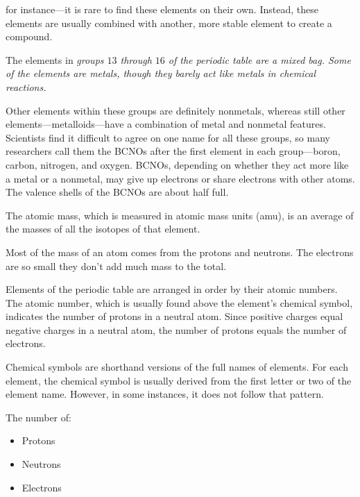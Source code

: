 for instance—it is rare to find these elements on their own. Instead, these
elements are usually combined with another, more stable element to create a
compound.

The elements in \it{groups $13$} through $16$ of the periodic table are a
mixed bag. Some of the elements are metals, though they barely act like metals
in chemical reactions.

Other elements within these groups are definitely nonmetals, whereas still other
elements—metalloids—have a combination of metal and nonmetal features.
Scientists find it difficult to agree on one name for all these groups, so many
researchers call them the BCNOs after the first element in each group—boron,
carbon, nitrogen, and oxygen. BCNOs, depending on whether they act more like a
metal or a nonmetal, may give up electrons or share electrons with other atoms.
The valence shells of the BCNOs are about half full.

\begin{definition}
    The atomic mass, which is measured in atomic mass units (amu), is an average of the masses of all the isotopes of that element.

    Most of the mass of an atom comes from the protons and neutrons. The electrons are so small they don't add much mass to the total.
\end{definition}

\begin{definition}
    Elements of the periodic table are arranged in order by their atomic
    numbers. The atomic number, which is usually found above the element's
    chemical symbol, indicates the number of protons in a neutral atom. Since
    positive charges equal negative charges in a neutral atom, the number of
    protons equals the number of electrons.
\end{definition}

\begin{definition}
    Chemical symbols are shorthand versions of the full names of elements. For
    each element, the chemical symbol is usually derived from the first letter
    or two of the element name. However, in some instances, it does not follow
    that pattern.
\end{definition}

The number of:

\begin{itemize}
    \item Protons
    \item Neutrons
    \item Electrons
\end{itemize}

